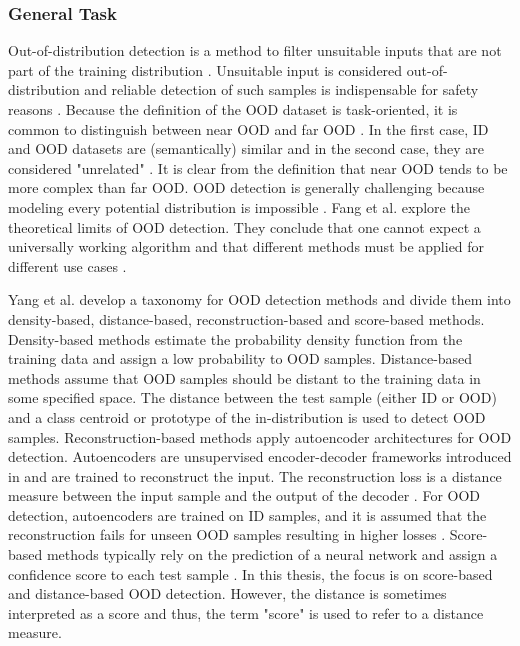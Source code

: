 \subsubsection{General Task}
Out-of-distribution detection is a method to filter unsuitable inputs that are not part of the training distribution \citep{Yang2021}.
Unsuitable input is considered out-of-distribution and reliable detection of such samples is indispensable for safety reasons \citep{Yang2021}.
Because the definition of the OOD dataset is task-oriented, it is common to distinguish between near OOD and far OOD \citep{Winkens2020}.
In the first case, ID and OOD datasets are (semantically) similar and in the second case, they are considered "unrelated" \citep{Winkens2020}.
It is clear from the definition that near OOD tends to be more complex than far OOD.
OOD detection is generally challenging because modeling every potential distribution is impossible \citep{Salehi2022}.
Fang et al. \citep{Fang2023} explore the theoretical limits of OOD detection.
They conclude that one cannot expect a universally working algorithm and that different methods must be applied for different use cases \citep{Fang2023}.
\par
Yang et al. \citep{Yang2021} develop a taxonomy for OOD detection methods and divide them into density-based, distance-based, reconstruction-based and score-based methods.
Density-based methods estimate the probability density function from the training data and assign a low probability to OOD samples.
Distance-based methods assume that OOD samples should be distant to the training data in some specified space.
The distance between the test sample (either ID or OOD) and a class centroid or prototype of the in-distribution is used to detect OOD samples.
Reconstruction-based methods apply autoencoder architectures for OOD detection.
Autoencoders are unsupervised encoder-decoder frameworks introduced in \citep{Rumelhart1986} and are trained to reconstruct the input.
The reconstruction loss is a distance measure between the input sample and the output of the decoder \citep{Baldi2012, Bank2020}.
For OOD detection, autoencoders are trained on ID samples, and it is assumed that the reconstruction fails for unseen OOD samples resulting in higher losses \citep{Denouden2018}.
Score-based methods typically rely on the prediction of a neural network and assign a confidence score to each test sample \citep{Yang2021}.
In this thesis, the focus is on score-based and distance-based OOD detection.
However, the distance is sometimes interpreted as a score and thus, the term "score" is used to refer to a distance measure.
